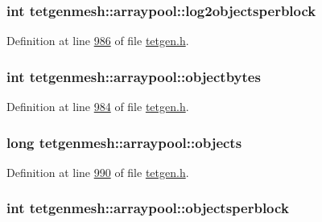 \subsubsection[{\texorpdfstring{log2objectsperblock}{log2objectsperblock}}]{\setlength{\rightskip}{0pt plus 5cm}int tetgenmesh\+::arraypool\+::log2objectsperblock}\hypertarget{classtetgenmesh_1_1arraypool_ab61ada3b2fc49879a160a919e9994279}{}\label{classtetgenmesh_1_1arraypool_ab61ada3b2fc49879a160a919e9994279}


Definition at line \hyperlink{tetgen_8h_source_l00986}{986} of file \hyperlink{tetgen_8h_source}{tetgen.\+h}.

\subsubsection[{\texorpdfstring{objectbytes}{objectbytes}}]{\setlength{\rightskip}{0pt plus 5cm}int tetgenmesh\+::arraypool\+::objectbytes}\hypertarget{classtetgenmesh_1_1arraypool_a469ac2a2833a25faa0f99ab011122e2d}{}\label{classtetgenmesh_1_1arraypool_a469ac2a2833a25faa0f99ab011122e2d}


Definition at line \hyperlink{tetgen_8h_source_l00984}{984} of file \hyperlink{tetgen_8h_source}{tetgen.\+h}.

\subsubsection[{\texorpdfstring{objects}{objects}}]{\setlength{\rightskip}{0pt plus 5cm}long tetgenmesh\+::arraypool\+::objects}\hypertarget{classtetgenmesh_1_1arraypool_a23345232309fd68d2e3afa6d017299b0}{}\label{classtetgenmesh_1_1arraypool_a23345232309fd68d2e3afa6d017299b0}


Definition at line \hyperlink{tetgen_8h_source_l00990}{990} of file \hyperlink{tetgen_8h_source}{tetgen.\+h}.

\subsubsection[{\texorpdfstring{objectsperblock}{objectsperblock}}]{\setlength{\rightskip}{0pt plus 5cm}int tetgenmesh\+::arraypool\+::objectsperblock}\hypertarget{classtetgenmesh_1_1arraypool_a2b6ba46461d5c8f0e6043bdd111246dd}{}\label{classtetgenmesh_1_1arraypool_a2b6ba46461d5c8f0e6043bdd111246dd}


